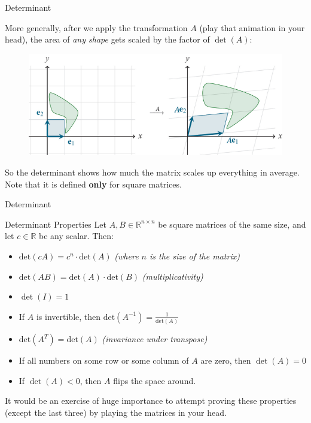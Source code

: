 \documentclass{beamer}
\newcommand{\R}{\mathbb{R}}
\begin{document}
\begin{frame}{Determinant}

More generally, after we apply the transformation $A$ (play that animation in your head), the area of \textit{any shape} gets scaled by the factor of $\det(A)$:

\begin{figure}
    \centering
    \includegraphics[width=0.75\linewidth]{viz area.png}
    
    
\end{figure}
\pause

 So the determinant shows how much the matrix scales up everything in average. Note that it is defined \textbf{only} for square matrices. 
\end{frame}


\begin{frame}{Determinant}
    
  \begin{block}{Determinant Properties}
    Let \(A, B\in\R^{n\times n}\) be square matrices of the same size, and let \(c\in\R\) be any scalar. Then:

    \begin{itemize}
      \item \(\text{det}(cA) = c^n \cdot \text{det}(A)\) \textit{(where \(n\) is the size of the matrix)}
      \item \(\text{det}(AB) = \text{det}(A) \cdot \text{det}(B)\) \textit{(multiplicativity)}
      \item $\det(I)=1$
\item If \(A\) is invertible, then \(\text{det}(A^{-1}) = \frac{1}{\text{det}(A)}\)
      \item \(\text{det}(A^T) = \text{det}(A)\) \textit{(invariance under transpose)}
      \item If all numbers on some row or some column of $A$ are zero, then $\det(A)=0$
       \item If $\det (A) <0$, then $A$ flips the space around.
    \end{itemize}
  \end{block}

  \pause

It would be an exercise of huge importance 
  to attempt proving these properties (except the last three) by playing the matrices in your head. 
\end{frame}
\end{document}
